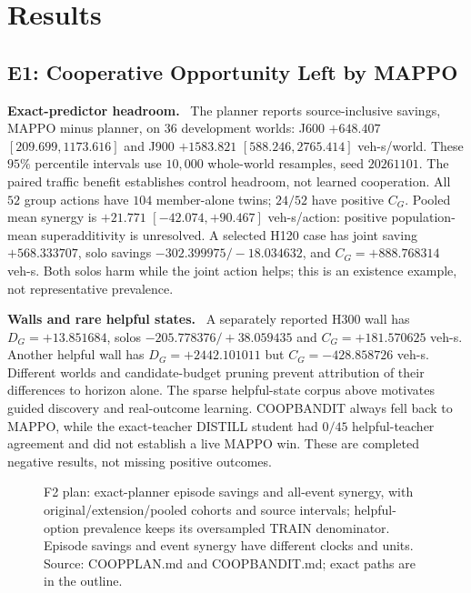 \documentclass[conference]{IEEEtran}
\newcommand{\blankpanel}[1]{\fbox{\rule{0pt}{#1}\rule{0.94\columnwidth}{0pt}}}
\newcommand{\para}[1]{\noindent\textbf{#1}\ }
\begin{document}
\section{Results}
\subsection{E1: Cooperative Opportunity Left by MAPPO}
\para{Exact-predictor headroom.}
The planner reports source-inclusive savings, MAPPO minus planner, on
$36$ development worlds: J600 $+648.407$ $[209.699,1173.616]$ and
J900 $+1583.821$ $[588.246,2765.414]$ veh-s/world.
These $95\%$ percentile intervals use $10{,}000$ whole-world resamples,
seed $20261101$. The paired traffic benefit establishes control headroom,
not learned cooperation.
All
$52$ group actions have $104$ member-alone twins; $24/52$ have positive
$C_G$. Pooled mean synergy is $+21.771$ $[-42.074,+90.467]$ veh-s/action:
positive population-mean superadditivity is unresolved. A selected H120
case has joint saving $+568.333707$, solo savings
$-302.399975/-18.034632$, and $C_G=+888.768314$ veh-s.
Both solos harm while the joint action helps; this is an existence example,
not representative prevalence.

\para{Walls and rare helpful states.}
A separately reported
H300 wall has $D_G=+13.851684$, solos $-205.778376/+38.059435$ and
$C_G=+181.570625$ veh-s. Another helpful wall has
$D_G=+2442.101011$ but $C_G=-428.858726$ veh-s.
Different worlds and candidate-budget pruning prevent attribution of their
differences to horizon alone. The sparse helpful-state corpus above
motivates guided discovery and real-outcome learning. COOPBANDIT always fell back to
MAPPO, while the exact-teacher DISTILL student had
$0/45$ helpful-teacher agreement and did not establish a live MAPPO win.
These are completed negative results, not missing positive outcomes.

\begin{figure}[t]
\centering\blankpanel{1.10in}
\caption{F2 plan: exact-planner episode savings and all-event synergy,
with original/extension/pooled cohorts and source intervals; helpful-option
prevalence keeps its oversampled TRAIN denominator. Episode savings and
event synergy have different clocks and units. Source: COOPPLAN.md and
COOPBANDIT.md; exact paths are in the outline.}
\label{fig:opportunity}
\end{figure}
\end{document}

